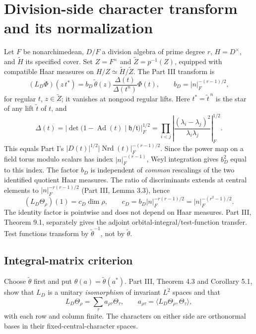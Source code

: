 \documentclass[11pt]{article}
\newcommand{\Nrd}{\operatorname{Nrd}}
\newcommand{\tH}{\widetilde H}
\newcommand{\tZ}{\widetilde Z}
\newcommand{\tth}{\widetilde\theta}
\theoremstyle{plain}
\theoremstyle{definition}
\begin{document}
\section{Division-side character transform and its normalization}\label{sec:transform}
Let $F$ be nonarchimedean, $D/F$ a division algebra of prime
degree $r$, $H=D^\times$, and $\tH$ its specified cover.
Set $Z=F^\times$ and $\tZ=p^{-1}(Z)$, equipped with compatible
Haar measures on $H/Z\simeq\tH/\tZ$.  The Part III transform is
\begin{equation}\label{eq:LD}
 (L_D\Phi)(z\,t^*)
 =b_D\,\tth(z)
  \frac{\Delta(t)}{\Delta(t^n)}\Phi(t),\qquad
 b_D=|n|_F^{-(r-1)/2},
\end{equation}
for regular $t$, $z\in\tZ$; it vanishes at nongood regular lifts.
Here $t^*=\tilde t^{\,n}$ is the star of any lift $\tilde t$ of $t$, and
\begin{equation}\label{eq:Delta}
 \Delta(t)=\left|\det\bigl(1-\operatorname{Ad}(t)
 \mid\mathfrak h/\mathfrak t\bigr)\right|_F^{1/2}
 =\prod_{i<j}\left|
 \frac{(\lambda_i-\lambda_j)^2}{\lambda_i\lambda_j}
 \right|_F^{1/2}.
\end{equation}
This equals Part I's $|D(t)|^{1/2}|\Nrd(t)|_F^{-(r-1)/2}$.
Since the power map on a field torus modulo scalars has index
$|n|_F^{-(r-1)}$, Weyl integration gives $b_D^2$
equal to this index.  The factor $b_D$ is independent of
\emph{common} rescalings of the two identified quotient Haar
measures.  The ratio of discriminants extends at central elements
to $|n|_F^{-r(r-1)/2}$ (Part III, Lemma 3.3), hence
\begin{equation}\label{eq:cD}
 (L_D\Theta_\rho)(1)=c_D\dim\rho,\qquad
 c_D=b_D|n|_F^{-r(r-1)/2}
 =|n|_F^{-(r^2-1)/2}.
\end{equation}
The identity factor is pointwise and does not depend on Haar
measures.  Part III, Theorem 9.1, separately gives the adjoint
orbital-integral/test-function transfer.  Test functions transform
by $\tth^{-1}$, not by $\tth$.

\subsection{Integral-matrix criterion}\label{subsec:integral}
Choose $\tth$ first and put
$\theta(a)=\tth(a^*)$.
Part III, Theorem 4.3 and Corollary 5.1, show that $L_D$ is a
unitary \emph{isomorphism} of invariant $L^2$ spaces and that
\begin{equation}\label{eq:matrixchars}
 L_D\Theta_\rho=\sum_\tau a_{\rho\tau}\Theta_\tau,
 \qquad a_{\rho\tau}=\langle L_D\Theta_\rho,
 \Theta_\tau\rangle,
\end{equation}
with each row and column finite.  The characters on either side
are orthonormal bases in their fixed-central-character spaces.
\end{document}

